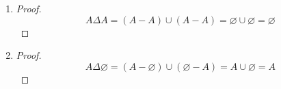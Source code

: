 \documentclass[12pt,letterpaper]{article}
\begin{document}
\begin{enumerate}
\begin{enumerate}
\begin{enumerate}
              \begin{proof}
                \begin{align*}
                  A \Delta B
                  &= \left(A - B\right) \cup \left(B - A\right) \\
                  &= \{x | \left(x \in A \land x \notin B\right) \lor \left(x \in B \land x \notin A\right)\} \\
                  &= \{x | \left[\left(x \in A \land x \notin B\right) \lor x \in B\right] \land \left[\left(x \in A \land x \notin B\right) \lor x \notin A\right]\} \\
                  &= \{x | \left(x \in A \lor x \in B\right) \land \left(x \notin B \lor x \in B\right) \\
                  &\quad \quad \land \left(x \in A \lor x \notin A\right) \land \left(x \notin B \lor x \notin A\right)\} \\
                  &= \{x | \left(x \in A \lor x \in B\right) \land \left(x \notin B \lor x \notin A\right)\} \\
                  &= \{x | \left(x \in A \lor x \in B\right) \land \left(x \notin A \lor x \notin B\right)\} \\
                  &= \{x | \left(x \in A \lor x \in B\right) \land \sim\left(x \in A \land x \in B\right)\} \\
                  &= \{x | \left(x \in A \cup B\right) \land \sim\left(x \in A \cap B\right)\} \\
                  &= \{x | \left(x \in A \cup B\right) \land \left(x \notin A \cap B\right)\} \\
                  &= \left(A \cup B\right) - \left(A \cap B\right) \\
                \end{align*}
              \end{proof}
            \item
              \begin{proof}
                \[
                  A \Delta A = \left(A - A\right) \cup \left(A - A\right) = \varnothing \cup \varnothing = \varnothing
                \]
              \end{proof}
            \item
              \begin{proof}
                \[
                  A \Delta \varnothing = \left(A - \varnothing\right) \cup \left(\varnothing - A\right) = A \cup \varnothing = A
                \]
              \end{proof}

\end{enumerate}
\end{enumerate}
\end{enumerate}
\end{document}
